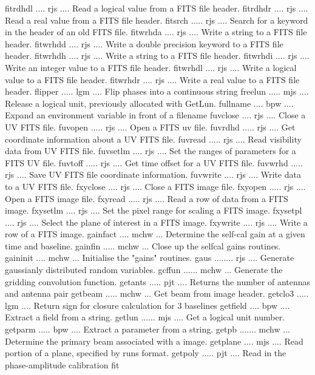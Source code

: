 {\eightpoint\begintt
fitrdhdl .... rjs .... Read a logical value from a FITS file header. 
fitrdhdr .... rjs .... Read a real value from a FITS file header. 
fitsrch ..... rjs .... Search for a keyword in the header of an old FITS file. 
fitwrhda .... rjs .... Write a string to a FITS file header. 
fitwrhdd .... rjs .... Write a double precision keyword to a FITS file header. 
\endtt}
{\eightpoint\begintt
fitwrhdh .... rjs .... Write a string to a FITS file header. 
fitwrhdi .... rjs .... Write an integer value to a FITS file header. 
fitwrhdl .... rjs .... Write a logical value to a FITS file header. 
fitwrhdr .... rjs .... Write a real value to a FITS file header. 
flipper ..... lgm .... Flip phases into a continuous string 
\endtt}
{\eightpoint\begintt
freelun ..... mjs .... Release a logical unit, previously allocated with GetLun.
fullname .... bpw .... Expand an environment variable in front of a filename 
fuvclose .... rjs .... Close a UV FITS file. 
fuvopen ..... rjs .... Open a FITS uv file. 
fuvrdhd ..... rjs .... Get coordinate information about a UV FITS file. 
\endtt}
{\eightpoint\begintt
fuvread ..... rjs .... Read visibility data from UV FITS file. 
fuvsetlm .... rjs .... Set the ranges of parameters for a FITS UV file. 
fuvtoff ..... rjs .... Get time offset for a UV FITS file. 
fuvwrhd ..... rjs .... Save UV FITS file coordinate information. 
fuvwrite .... rjs .... Write data to a UV FITS file. 
\endtt}
{\eightpoint\begintt
fxyclose .... rjs .... Close a FITS image file. 
fxyopen ..... rjs .... Open a FITS image file. 
fxyread ..... rjs .... Read a row of data from a FITS image. 
fxysetlm .... rjs .... Set the pixel range for scaling a FITS image. 
fxysetpl .... rjs .... Select the plane of interest in a FITS image. 
\endtt}
{\eightpoint\begintt
fxywrite .... rjs .... Write a row of a FITS image. 
gainfact .... mchw ... Determine the self-cal gain at a given time and baseline.
gainfin ..... mchw ... Close up the selfcal gains routines. 
gaininit .... mchw ... Initialise the "gains" routines. 
gaus ........ rjs .... Generate gaussianly distributed random variables. 
\endtt}
{\eightpoint\begintt
gcffun ...... mchw ... Generate the gridding convolution function. 
getants ..... pjt .... Returns the number of antennas and antenna pair 
getbeam ..... mchw ... Get beam from image header. 
getclo3 ..... lgm .... Return sign for closure calculation for 3 baselines 
getfield .... bpw .... Extract a field from a string. 
\endtt}
{\eightpoint\begintt
getlun ...... mjs .... Get a logical unit number. 
getparm ..... bpw .... Extract a parameter from a string. 
getpb ....... mchw ... Determine the primary beam associated with a image. 
getplane .... mjs .... Read portion of a plane, specified by runs format. 
getpoly ..... pjt .... Read in the phase-amplitude calibration fit 
\endtt}

